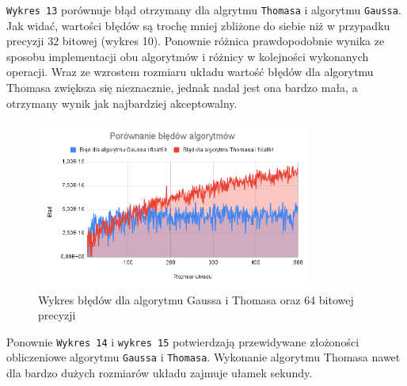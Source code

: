 \documentclass{article}
\begin{document}
\noindent
\texttt{Wykres 13} porównuje błąd otrzymany dla algrytmu \texttt{Thomasa} i algorytmu \texttt{Gaussa}. Jak widać, wartości błędów są trochę mniej zbliżone do siebie niż w przypadku precyzji 32 bitowej (wykres 10). Ponownie różnica prawdopodobnie wynika ze sposobu implementacji obu algorytmów i różnicy w kolejności wykonanych operacji. Wraz ze wzrostem rozmiaru układu wartość błędów dla algorytmu Thomasa zwiększa się nieznacznie, jednak nadal jest ona bardzo mała, a otrzymany wynik jak najbardziej akceptowalny.

\begin{figure}[H]
  \centering
    \includegraphics[width=0.8\textwidth]{images/img13.png}
  \caption{Wykres błędów dla algorytmu Gaussa i Thomasa oraz 64 bitowej precyzji}
\end{figure}

Ponownie \texttt{Wykres 14} i \texttt{wykres 15} potwierdzają przewidywane złożoności obliczeniowe algorytmu \texttt{Gaussa} i \texttt{Thomasa}. Wykonanie algorytmu Thomasa nawet dla bardzo dużych rozmiarów układu zajmuje ułamek sekundy. 
\end{document}
